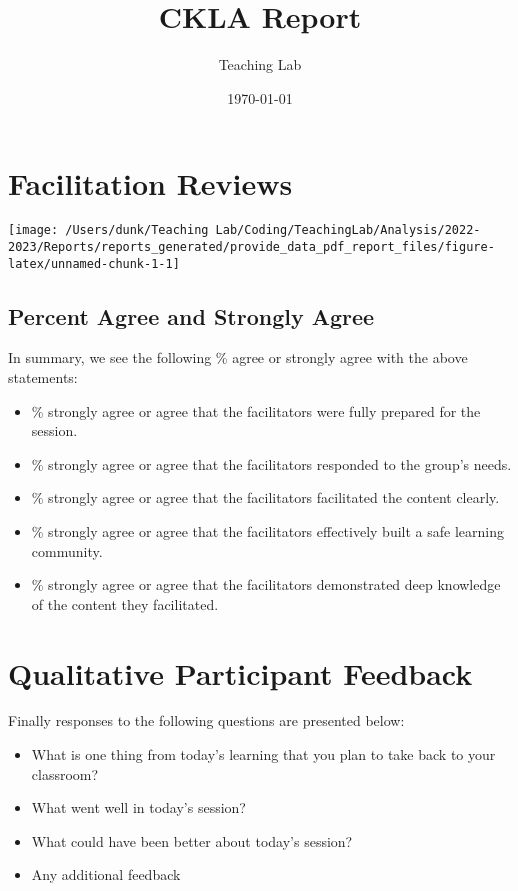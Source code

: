 \documentclass[10,a4paperpaper,]{article}
\title{CKLA Report}
\author{Teaching Lab}
\date{\today}
\begin{document}
\renewcommand{\contentsname}{Table of Contents}

\renewcommand{\pagename}{Page}


\maketitle
\tableofcontents
{}

\section{Facilitation Reviews}

\begin{center}\texttt{[image: /Users/dunk/Teaching Lab/Coding/TeachingLab/Analysis/2022-2023/Reports/reports\_generated/provide\_data\_pdf\_report\_files/figure-latex/unnamed-chunk-1-1]} \end{center}

\subsection{Percent Agree and Strongly Agree}

In summary, we see the following \% agree or strongly agree with the
above statements:

\begin{itemize}
\tightlist
\item
  \% strongly agree or agree that the facilitators were fully prepared
  for the session.
\item
  \% strongly agree or agree that the facilitators responded to the
  group's needs.
\item
  \% strongly agree or agree that the facilitators facilitated the
  content clearly.
\item
  \% strongly agree or agree that the facilitators effectively built a
  safe learning community.
\item
  \% strongly agree or agree that the facilitators demonstrated deep
  knowledge of the content they facilitated.
\end{itemize}

\section{Qualitative Participant Feedback}

Finally responses to the following questions are presented below:

\begin{itemize}
\item
  What is one thing from today's learning that you plan to take back to
  your classroom?
\item
  What went well in today's session?
\item
  What could have been better about today's session?
\item
  Any additional feedback
\end{itemize}
\end{document}
